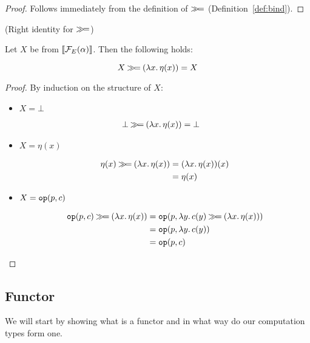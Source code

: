 \begin{proof}
  Follows immediately from the definition of $\mathbin{\gg\!=}$
  (Definition~\ref{def:bind}).
\end{proof}

\begin{law}\label{law:right-identity}
  (Right identity for $\mathbin{\gg\!=}$)
  
  Let $X$ be from $\llbracket \mathcal{F}_E(\alpha) \rrbracket$. Then the following holds:

  $$
  X \mathbin{\gg\!=} (\lambda x.\, \eta(x)) = X
  $$
\end{law}

\begin{proof}
  By induction on the structure of $X$:
  
  \begin{itemize}
  \item $X = \bot$
    
    \vspace{-0.5cm}
    \begin{align*}
      \bot \mathbin{\gg\!=} (\lambda x.\, \eta(x))
      &= \bot
    \end{align*}
   
  \item $X = \eta(x)$
    
    \vspace{-0.5cm}
    \begin{align*}
      \eta(x) \mathbin{\gg\!=} (\lambda x.\, \eta(x))
      &= (\lambda x.\, \eta(x))(x) \\
      &= \eta(x)
    \end{align*}
    
  \item $X = \mathtt{op}(p, c)$

    \vspace{-0.5cm}
    \begin{align*}
      \mathtt{op}(p, c) \mathbin{\gg\!=} (\lambda x.\, \eta(x))
      &= \mathtt{op}(p, \lambda y.\, c(y) \mathbin{\gg\!=} (\lambda x.\, \eta(x))) \\
      &= \mathtt{op}(p, \lambda y.\, c(y)) \\
      &= \mathtt{op}(p, c)
    \end{align*}
  \end{itemize}
\end{proof}


\subsection{Functor}
\label{ssec:functor}

We will start by showing what is a functor and in what way do our
computation types form one.

